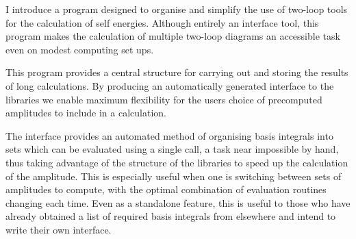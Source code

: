 I introduce a program designed to organise and simplify the use of two-loop tools for the calculation of self energies.  Although entirely an interface tool, this program makes the calculation of multiple two-loop diagrams an accessible task even on modest computing set ups.

This program provides a central structure for carrying out and storing the results of long calculations.  By producing an automatically generated interface to the \tsil libraries we enable maximum flexibility for the users choice of precomputed amplitudes to include in a calculation.

The \tsil interface provides an automated method of organising basis integrals into sets which can be evaluated using a single \tsil call, a task near impossible by hand, thus taking advantage of the structure of the \tsil libraries to speed up the calculation of the amplitude.  This is especially useful when one is switching between sets of amplitudes to compute, with the optimal combination of evaluation routines changing each time. Even as a standalone feature, this is useful to those who have already obtained a list of required basis integrals from elsewhere and intend to write their own \tsil interface.




{}


  
